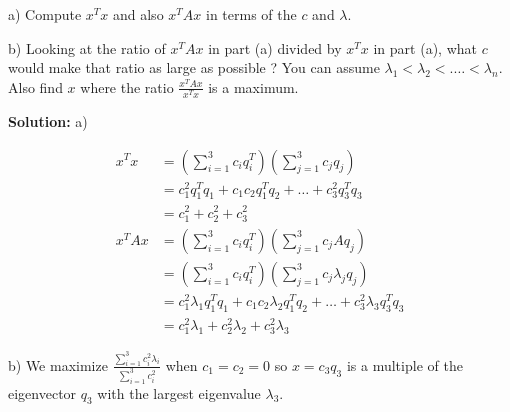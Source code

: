 \documentclass[12pt]{article}
\begin{document}
	a) Compute $x^Tx$ and also $x^TAx$ in terms of the $c$ and $\lambda$.
	
	b) Looking at the ratio of $x^TAx$ in part (a) divided by $x^Tx$ in part (a), what $c$ would make that ratio as large as possible ? You can assume $\lambda_1 < \lambda_2 < .\dots < \lambda_n$. Also find $x$ where the ratio $\frac{x^TAx}{x^Tx}$ is a maximum.
	
	\begin{framed}
		\textbf{Solution:}
		a) 
		
		\begin{align}
			x^Tx &= \left(\sum_{i = 1}^{3} c_iq_i^T\right)\left(\sum_{j = 1}^{3} c_jq_j\right) \\
			&= c_1^2 q_1^T q_1 + c_1 c_2 q_1^T q_2 + \dots + c_3^2 q_3^T q_3 \\
			&= c_1^2 + c_2^2 + c_3^2 \\
			x^TAx &= \left(\sum_{i = 1}^{3} c_iq_i^T\right)\left(\sum_{j = 1}^{3} c_jAq_j\right) \\
			&= \left(\sum_{i = 1}^{3} c_iq_i^T\right)\left(\sum_{j = 1}^{3} c_j \lambda_j q_j\right) \\
			&= c_1^2 \lambda_1 q_1^T q_1 + c_1 c_2 \lambda_2 q_1^T q_2 + \dots + c_3^2 \lambda_3 q_3^T q_3 \\
			&= c_1^2 \lambda_1 + c_2^2 \lambda_2 + c_3^2 \lambda_3
		\end{align}
		
		b) We maximize $\frac{\sum_{i=1}^{3} c_i^2 \lambda_i}{\sum_{i=1}^{3} c_i^2}$ when $c_1 = c_2 = 0$ so $x = c_3q_3$ is a multiple of the eigenvector $q_3$ with the largest eigenvalue $\lambda_3$.
	\end{framed}
	
	
	
\end{document}
